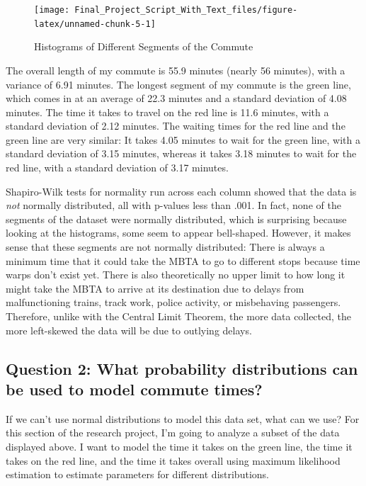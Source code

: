 \documentclass[
]{article}
\begin{document}
\begin{figure}
\texttt{[image: Final\_Project\_Script\_With\_Text\_files/figure-latex/unnamed-chunk-5-1]} \caption{Histograms of Different Segments of the Commute}\label{fig:unnamed-chunk-5}
\end{figure}

The overall length of my commute is 55.9 minutes (nearly 56 minutes),
with a variance of 6.91 minutes. The longest segment of my commute is
the green line, which comes in at an average of 22.3 minutes and a
standard deviation of 4.08 minutes. The time it takes to travel on the
red line is 11.6 minutes, with a standard deviation of 2.12 minutes. The
waiting times for the red line and the green line are very similar: It
takes 4.05 minutes to wait for the green line, with a standard deviation
of 3.15 minutes, whereas it takes 3.18 minutes to wait for the red line,
with a standard deviation of 3.17 minutes.

Shapiro-Wilk tests for normality run across each column showed that the
data is \emph{not} normally distributed, all with p-values less than
.001. In fact, none of the segments of the dataset were normally
distributed, which is surprising because looking at the histograms, some
seem to appear bell-shaped. However, it makes sense that these segments
are not normally distributed: There is always a minimum time that it
could take the MBTA to go to different stops because time warps don't
exist yet. There is also theoretically no upper limit to how long it
might take the MBTA to arrive at its destination due to delays from
malfunctioning trains, track work, police activity, or misbehaving
passengers. Therefore, unlike with the Central Limit Theorem, the more
data collected, the more left-skewed the data will be due to outlying
delays.

\hypertarget{question-2-what-probability-distributions-can-be-used-to-model-commute-times}{%
\subsection{Question 2: What probability distributions can be used to
model commute
times?}\label{question-2-what-probability-distributions-can-be-used-to-model-commute-times}}

If we can't use normal distributions to model this data set, what can we
use? For this section of the research project, I'm going to analyze a
subset of the data displayed above. I want to model the time it takes on
the green line, the time it takes on the red line, and the time it takes
overall using maximum likelihood estimation to estimate parameters for
different distributions.
\end{document}
